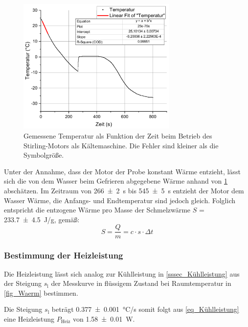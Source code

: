 \documentclass[
	a4paper,
	12pt,
	pagesize,
	ngerman
]{scrartcl}
\begin{document}
	\begin{figure}[H]
		\includegraphics[width=0.7\textwidth]{Kuehl}
		\centering
		\caption{Gemessene Temperatur als Funktion der Zeit beim Betrieb des Stirling-Motors als Kältemaschine. Die Fehler sind kleiner als die Symbolgröße.}
		\label{fig_Kuehl}
		\centering
	\end{figure}

	Unter der Annahme, dass der Motor der Probe konstant Wärme entzieht, lässt sich die von dem Wasser beim Gefrieren abgegebene Wärme anhand von \cref{fig_Kuehl} abschätzen.
	Im Zeitraum von \SI{266+-2}{s} bis \SI{545+-5}{s} entzieht der Motor dem Wasser Wärme, die Anfangs- und Endtemperatur sind jedoch gleich. 
	Folglich entspricht die entzogene Wärme pro Masse der Schmelzwärme $S$ = \SI{233,7+-4.5}{J/g}, gemäß:
	\begin{equation}
	S = \frac{Q}{m} = c \cdot s\cdot \Delta{t}
	\end{equation}
	
	
	
	\subsubsection{Bestimmung der Heizleistung}
	Die Heizleistung lässt sich analog zur Kühlleistung in \cref{sssec_Kühlleistung} aus der Steigung $s_\text{l}$ der Messkurve in flüssigem Zustand bei Raumtemperatur in \cref{fig_Waerm} bestimmen. 
	
	Die Steigung $s_\text{l}$ beträgt \SI{0,377+-0,001}{\degreeCelsius/s} somit folgt aus \cref{eq_Kühlleistung} eine Heizleistung $P_\text{Heiz}$ von \SI{1,58+-0,01}{W}.
	
\end{document}
